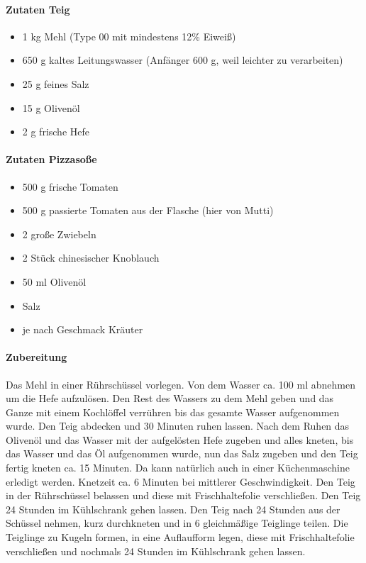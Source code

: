 \paragraph{Zutaten Teig}

\begin{itemize}[noitemsep]
	\item 1 kg Mehl (Type 00 mit mindestens 12\% Eiweiß)
	\item 650 g kaltes Leitungswasser (Anfänger 600 g, weil leichter zu 
	verarbeiten)
	\item 25 g feines Salz
	\item 15 g Olivenöl
	\item 2 g frische Hefe
\end{itemize} 

\paragraph{Zutaten Pizzasoße}
 
\begin{itemize}[noitemsep]
	\item 500 g frische Tomaten
	\item 500 g passierte Tomaten aus der Flasche (hier von Mutti)
	\item 2 große Zwiebeln
	\item 2 Stück chinesischer Knoblauch
	\item 50 ml Olivenöl
	\item Salz
	\item je nach Geschmack Kräuter
\end{itemize}

\paragraph{Zubereitung }
Das Mehl in einer Rührschüssel vorlegen. Von dem Wasser ca. 100 ml 
abnehmen um die Hefe aufzulösen. Den Rest des Wassers zu dem Mehl geben 
und das Ganze mit einem Kochlöffel verrühren bis das gesamte Wasser 
aufgenommen wurde. Den Teig  abdecken und 30 Minuten ruhen lassen. Nach 
dem Ruhen das Olivenöl und das Wasser mit der aufgelösten Hefe zugeben und 
alles kneten, bis das Wasser und das Öl aufgenommen wurde, nun das Salz 
zugeben und den Teig fertig kneten ca. 15 Minuten. Da kann natürlich auch in 
einer Küchenmaschine erledigt werden. Knetzeit ca. 6 Minuten bei mittlerer 
Geschwindigkeit.
Den Teig in der Rührschüssel belassen und diese mit Frischhaltefolie 
verschließen. Den Teig 24 Stunden im Kühlschrank gehen lassen. Den Teig 
nach 24 Stunden aus der Schüssel nehmen, kurz durchkneten und in 6 
gleichmäßige Teiglinge teilen. Die Teiglinge zu Kugeln formen, in eine 
Auflaufform legen, diese mit Frischhaltefolie verschließen und nochmals 24 
Stunden im Kühlschrank gehen lassen. 

